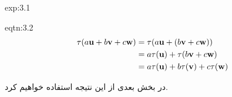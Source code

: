 {\begin{spacing}{1.5}
\begin{example}{exp:3.1}
            \begin{eqtn}{eqtn:3.2}
                \centering
                \begin{equation*}
                    \centering
                    \begin{split}
                        \tau(a\textbf{u}+b\textbf{v}+c\textbf{w})&=\tau(a\textbf{u}+(b\textbf{v}+c\textbf{w})) \\
                        &=a\tau(\textbf{u})+\tau(b\textbf{v}+c\textbf{w})\\
                        &=a\tau(\textbf{u})+b\tau(\textbf{v})+c\tau(\textbf{w})
                    \end{split}
                \end{equation*}
            \end{eqtn}

            در بخش بعدی از این نتیجه استفاده خواهیم کرد.
        \end{example}
    \end{spacing}
}

